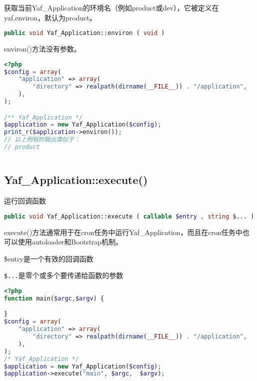 获取当前Yaf\_Application的环境名（例如product或dev），它被定义在yaf.environ，默认为product。






\begin{lstlisting}[language=PHP]
public void Yaf_Application::environ ( void )
\end{lstlisting}

environ()方法没有参数。

\begin{lstlisting}[language=PHP]
<?php
$config = array(
    "application" => array(
        "directory" => realpath(dirname(__FILE__)) . "/application",
    ),
);

/** Yaf_Application */
$application = new Yaf_Application($config);
print_r($application->environ());
// 以上例程的输出类似于：
// product
\end{lstlisting}



\begin{lstlisting}[language=PHP]

\end{lstlisting}


\subsection{Yaf\_Application::execute()}

运行回调函数






\begin{lstlisting}[language=PHP]
public void Yaf_Application::execute ( callable $entry , string $... )
\end{lstlisting}

execute()方法通常用于在cron任务中运行Yaf\_Application，而且在cron任务中也可以使用autoloader和Bootstrap机制。

\begin{compactitem}
\item \$entry是一个有效的回调函数
\item \texttt{\$...}是零个或多个要传递给函数的参数
\end{compactitem}



\begin{lstlisting}[language=PHP]
<?php
function main($argc,$argv) {

}
$config = array(
    "application" => array(
        "directory" => realpath(dirname(__FILE__)) . "/application",
    ),
);
/* Yaf_Application */
$application = new Yaf_Application($config);
$application->execute("main", $argc,  $argv);
\end{lstlisting}



